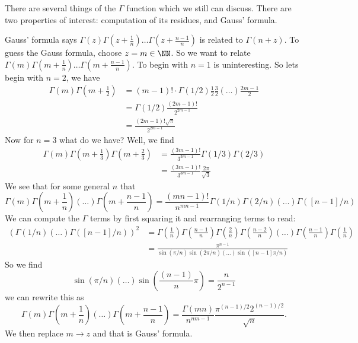 There are several things of the $\Gamma$ function which we still
can discuss. There are two properties of interest: computation of
its residues, and Gauss' formula.

Gauss' formula says
$\Gamma(z)\Gamma(z+\frac{1}{n})\dots\Gamma(z+\frac{n-1}{n})$ is
related to $\Gamma(n+z)$. To guess the Gauss formula, choose
$z=m\in\NN$. So we want to relate
$\Gamma(m)\Gamma(m+\frac{1}{n})\dots\Gamma(m+\frac{n-1}{n})$. To
begin with $n=1$ is uninteresting. So lets begin with $n=2$, we
have
\begin{subequations}
\begin{align}
\Gamma(m)\Gamma\left(m+\frac{1}{2}\right) &=
(m-1)!\cdot\Gamma(1/2)\frac{1}{2}\frac{3}{2}(\dots)\frac{2m-1}{2}\\
&=\Gamma(1/2)\frac{(2m-1)!}{2^{2m-1}}\\
&=\frac{(2m-1)!\sqrt{\pi}}{2^{2m-1}}
\end{align}
\end{subequations}
Now for $n=3$ what do we have? Well, we find
\begin{subequations}
\begin{align}
\Gamma(m)\Gamma\left(m+\frac{1}{3}\right)\Gamma\left(m+\frac{2}{3}\right)
&=\frac{(3m-1)!}{3^{3m-1}}\Gamma(1/3)\Gamma(2/3)\\
&=\frac{(3m-1)!}{3^{3m-1}}\frac{2\pi}{\sqrt{3}}
\end{align}
\end{subequations}
We see that for some general $n$ that
\begin{equation}
\Gamma(m)\Gamma\left(m+\frac{1}{n}\right)(\dots)\Gamma\left(m+\frac{n-1}{n}\right)=\frac{(mn-1)!}{n^{mn-1}}\Gamma(1/n)\Gamma(2/n)(\dots)\Gamma([n-1]/n)
\end{equation}
We can compute the $\Gamma$ terms by first squaring it and
rearranging terms to read:
\begin{align}
\left(\Gamma(1/n)(\dots)\Gamma([n-1]/n)\right)^{2}
&=\Gamma\left(\frac{1}{n}\right)
\Gamma\left(\frac{n-1}{n}\right)
\Gamma\left(\frac{2}{n}\right)
\Gamma\left(\frac{n-2}{n}\right)(\dots)
\Gamma\left(\frac{n-1}{n}\right)
\Gamma\left(\frac{1}{n}\right)\nonumber\\
&=\frac{\pi^{n-1}}{\sin(\pi/n)\sin(2\pi/n)(\dots)\sin([n-1]\pi/n)}
\end{align}
So we find
\begin{equation}
\sin(\pi/n)(\dots)\sin\left(\frac{(n-1)}{n}\pi\right)=\frac{n}{2^{n-1}}
\end{equation}
we can rewrite this as
\begin{equation}
\Gamma(m)\Gamma\left(m+\frac{1}{n}\right)(\dots)\Gamma\left(m+\frac{n-1}{n}\right)
=\frac{\Gamma(mn)}{n^{nm-1}}\frac{\pi^{(n-1)/2}2^{(n-1)/2}}{\sqrt{n}}.
\end{equation}
We then replace $m\to z$ and that is Gauss' formula.

